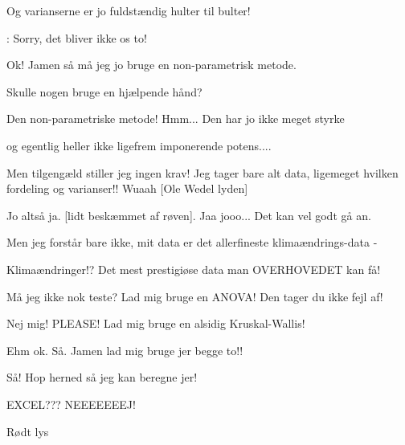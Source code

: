 \documentclass[a4paper,11pt]{article}
\begin{document}
\begin{sketch}
 Og varianserne er jo fuldstændig hulter til bulter! 


: Sorry, det bliver ikke os to! 

 Ok! Jamen så må jeg jo bruge en non-parametrisk metode.



  Skulle nogen bruge en hjælpende hånd?

 Den non-parametriske metode! Hmm... Den har jo ikke meget styrke


 og egentlig heller ikke ligefrem imponerende potens....


 Men tilgengæld stiller jeg ingen krav! Jeg tager bare alt data, ligemeget hvilken fordeling og varianser!! Wuaah [Ole Wedel lyden]


 Jo altså ja. [lidt beskæmmet af røven]. Jaa jooo... Det kan vel godt gå an. 


 Men jeg forstår bare ikke, mit data er det allerfineste klimaændrings-data -


 Klimaændringer!? Det mest prestigiøse data man OVERHOVEDET kan få!

 Må jeg ikke nok teste? Lad mig bruge en ANOVA! Den tager du ikke fejl af!


 Nej mig! PLEASE! Lad mig bruge en alsidig Kruskal-Wallis!


 Ehm ok. Så. Jamen lad mig bruge jer begge to!!



 Så! Hop herned så jeg kan beregne jer! 

 EXCEL??? NEEEEEEEJ!

\scene Rødt lys


\end{sketch}
\end{document}
